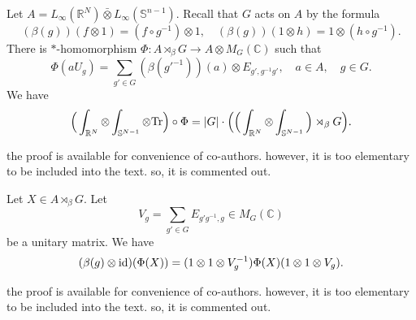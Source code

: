 \documentclass{amsart}
\begin{document}
\begin{lemma}\label{phi bot lemma} Let $A=L_{\infty}(\mathbb{R}^N)\bar{\otimes} L_{\infty}(\mathbb{S}^{n-1}).$ Recall that $G$ acts on $A$ by the formula
$$(\beta(g))(f\otimes 1)=(f\circ g^{-1})\otimes 1,\quad(\beta(g))(1\otimes h)=1\otimes (h\circ g^{-1}).$$
There is $\ast$-homomorphism $\Phi:A\rtimes_{\beta}G\to A\otimes M_G(\mathbb{C})$ such that
$$\Phi(aU_g)=\sum_{g'\in G}(\beta(g'^{-1}))(a)\otimes E_{g',g^{-1}g'},\quad a\in A,\quad g\in G.$$
We have
$$\Big(\int_{\mathbb{R}^N}\otimes\int_{\mathbb{S}^{N-1}}\otimes{\rm Tr}\Big)\circ\Phi=|G|\cdot \Big(\Big(\int_{\mathbb{R}^N}\otimes\int_{\mathbb{S}^{N-1}}\Big)\rtimes_{\beta}G\Big).$$
\end{lemma}
{\color{red} the proof is available for convenience of co-authors. however, it is too elementary to be included into the text. so, it is commented out.}
%
%
%

\begin{lemma}\label{phit g invariance lemma} Let $X\in A\rtimes_{\beta}G.$ Let
$$V_g=\sum_{g'\in G}E_{g'g^{-1},g}\in M_G(\mathbb{C})$$
be a unitary matrix. We have
$$(\beta(g)\otimes{\rm id})(\Phi(X))=(1\otimes 1\otimes V_g^{-1})\Phi(X)(1\otimes 1\otimes V_g).$$
\end{lemma}
{\color{red} the proof is available for convenience of co-authors. however, it is too elementary to be included into the text. so, it is commented out.}
\end{document}
